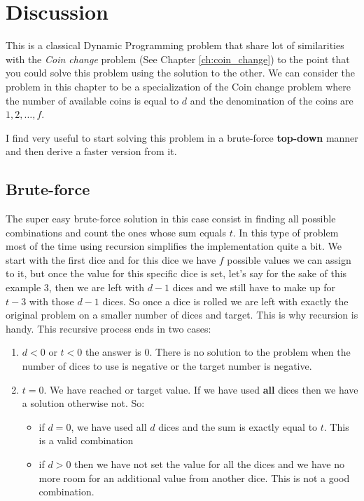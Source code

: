 \section{Discussion}
\label{dice_rolls:sec:discussion}

This is a classical Dynamic Programming problem that share lot of similarities with the \textit{Coin change} problem (See Chapter \ref{ch:coin_change}) to the point that you could solve this problem using the solution to the other. We can consider the problem in this chapter to be a specialization of the Coin change problem where the number of available coins is equal to $d$ and the denomination of the coins are $1,2,\ldots,f$.

I find very useful to start solving this problem in a brute-force \textbf{top-down} manner and then derive a faster version from it. 

\subsection{Brute-force}
\label{dice_rolls:sec:bruteforce}
The super easy brute-force solution in this case consist in finding all possible combinations and count the ones whose sum equals $t$. In this type of problem most of the time using recursion simplifies the implementation quite a bit. 
We start with the first dice and for this dice we have $f$ possible values we can assign to it, but once the value for this specific dice is set, let's say for the sake of this example $3$, then we are left with $d-1$ dices and we still have to make up for $t-3$  with those $d-1$ dices. So once a dice is rolled we are left with exactly the original problem on a smaller number of dices and target. This is why recursion is handy. This recursive process ends in two cases:

\begin{enumerate}
	\item $d<0$ or $t<0$ the answer is $0$. There is no solution to the problem when the number of dices to use is negative or the target number is negative.
	\item $t=0$. We have reached or target value. If we have used \textbf{all} dices then we have a solution otherwise not. So:
	\begin{itemize}
		\item if $d=0$, we have used all $d$ dices and the sum is exactly equal to $t$. This is a valid combination
		\item if $d>0$ then we have not set the value for all the dices and we have no more room for an additional value from another dice. This is not a good combination.
	\end{itemize}
\end{enumerate}


